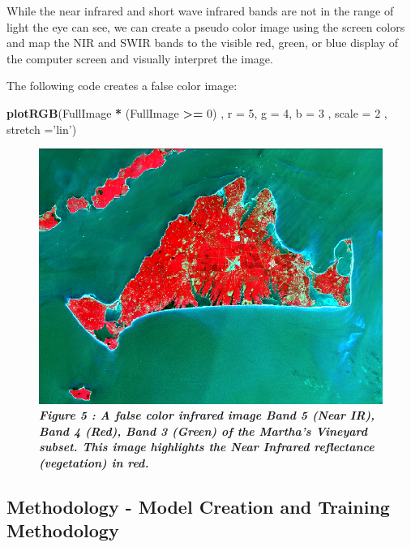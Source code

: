 \documentclass[]{article}
\newenvironment{Shaded}{\begin{snugshade}}{\end{snugshade}}
\newcommand{\KeywordTok}[1]{\textcolor[rgb]{0.13,0.29,0.53}{\textbf{#1}}}
\newcommand{\DataTypeTok}[1]{\textcolor[rgb]{0.13,0.29,0.53}{#1}}
\newcommand{\DecValTok}[1]{\textcolor[rgb]{0.00,0.00,0.81}{#1}}
\newcommand{\StringTok}[1]{\textcolor[rgb]{0.31,0.60,0.02}{#1}}
\newcommand{\OperatorTok}[1]{\textcolor[rgb]{0.81,0.36,0.00}{\textbf{#1}}}
\newcommand{\NormalTok}[1]{#1}
\begin{document}
While the near infrared and short wave infrared bands are not in the
range of light the eye can see, we can create a pseudo color image using
the screen colors and map the NIR and SWIR bands to the visible red,
green, or blue display of the computer screen and visually interpret the
image.

The following code creates a false color image:

\begin{Shaded}
\begin{Highlighting}[]
\KeywordTok{plotRGB}\NormalTok{(FullImage }\OperatorTok{*}\StringTok{ }\NormalTok{(FullImage }\OperatorTok{>=}\StringTok{ }\DecValTok{0}\NormalTok{)}
\NormalTok{        , }\DataTypeTok{r =} \DecValTok{5}\NormalTok{, }\DataTypeTok{g =} \DecValTok{4}\NormalTok{, }\DataTypeTok{b =} \DecValTok{3}
\NormalTok{        , }\DataTypeTok{scale =} \DecValTok{2}
\NormalTok{        , }\DataTypeTok{stretch =}\StringTok{'lin'}\NormalTok{)}
\end{Highlighting}
\end{Shaded}

\begin{figure}
\centering
\includegraphics{images/CIR_MV.png}
\caption{\textbf{\emph{Figure 5 : A false color infrared image Band 5
(Near IR), Band 4 (Red), Band 3 (Green) of the Martha's Vineyard subset.
This image highlights the Near Infrared reflectance (vegetation) in
red.}}}
\end{figure}

\subsection{Methodology - Model Creation and Training
Methodology}\label{methodology---model-creation-and-training-methodology}
\end{document}
